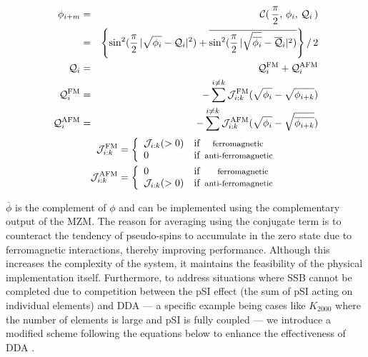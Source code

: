 \documentclass[%
 reprint,
 amsmath,amssymb,
 aps,
]{revtex4-2}
\begin{document}
\begin{widetext}
\begin{eqnarray}%
\phi_{i+m}
& = &  {\cal C}( \,\frac{\pi}{2}, \,\phi_{i},  \,{\cal Q}_{i} \,)\nonumber\\
& = &
\left\{\sin^{2}(\frac{\pi}{2} \,|\sqrt{\phi_{i}} -  {\cal Q}_{i} |^{2} ) +  \overline{ \sin^{2}(\frac{\pi}{2} \,|\sqrt{\overline{\phi_{i}}} -  {\overline{\cal Q}_{i} } |^{2} )} \right\}/ \,2  \\
{\cal Q}_{i}
& = &  
{\cal Q}_{i}^{\rm FM} + {\cal Q}_{i}^{\rm AFM} \\
{\cal Q}_{i}^{\rm FM}
& = &  
- \sum^{i \ne k} {\cal J}_{i:k}^{\rm FM}( \sqrt{\phi_{i}}  -  \sqrt{\phi_{i+k}})  \\
{\cal Q}_{i}^{\rm AFM}
& = &  
- \sum^{i \ne k} {\cal J}_{i:k}^{\rm AFM}( \sqrt{\phi_{i}}  -  \sqrt{\overline{\phi_{i+k}}})
\end{eqnarray}
\begin{eqnarray}
 {\cal J}_{i:k}^{\rm FM} = \left\{ \begin{array}{ll}
  {\cal J}_{i:k} (>0) & \mbox{if} \mbox{\footnotesize \rm \,\,\,\,\,\,\,\,\,ferromagnetic\,}\\
                                 0 & \mbox{if}\,\,\, \mbox{\footnotesize \rm  anti-ferromagnetic\,} \end{array} \right. \\
 {\cal J}_{i:k}^{\rm AFM} = \left\{ \begin{array}{ll}  0 & \mbox{if}\,\,\, \mbox{\footnotesize \rm  \,\,\,\,\,\,\,\,\,ferromagnetic\,} \\
                                  {\cal J}_{i:k} (>0) & \mbox{if} \,\,\,   \mbox{\footnotesize \rm  anti-ferromagnetic\,}  \end{array} \right. 
\end{eqnarray}
\end{widetext}

$\overline{\phi}$ is the complement of $\phi$ and can be implemented using the complementary output of the MZM. The reason for averaging using the conjugate term is to counteract the tendency of pseudo-spins to accumulate in the zero state due to ferromagnetic interactions, thereby improving performance\cite{Toshiy02}. Although this increases the complexity of the system, it maintains the feasibility of the physical implementation itself. Furthermore, to address situations where SSB cannot be completed due to competition between the pSI effect (the sum of pSI acting on individual elements) and DDA — a specific example being cases like $K_{2000}$ where the number of elements is large and pSI is fully coupled — we introduce a modified scheme following the equations below to enhance the effectiveness of DDA \cite{Toshiy02}.
\end{document}
